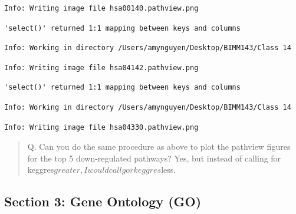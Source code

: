 \documentclass[
  letterpaper,
  DIV=11,
  numbers=noendperiod]{scrartcl}
\newenvironment{Shaded}{\begin{snugshade}}{\end{snugshade}}
\newcommand{\AttributeTok}[1]{\textcolor[rgb]{0.40,0.45,0.13}{#1}}
\newcommand{\CommentTok}[1]{\textcolor[rgb]{0.37,0.37,0.37}{#1}}
\newcommand{\FunctionTok}[1]{\textcolor[rgb]{0.28,0.35,0.67}{#1}}
\newcommand{\NormalTok}[1]{\textcolor[rgb]{0.00,0.23,0.31}{#1}}
\newcommand{\OtherTok}[1]{\textcolor[rgb]{0.00,0.23,0.31}{#1}}
\newcommand{\SpecialCharTok}[1]{\textcolor[rgb]{0.37,0.37,0.37}{#1}}
\begin{document}
\begin{verbatim}
Info: Writing image file hsa00140.pathview.png
\end{verbatim}

\begin{verbatim}
'select()' returned 1:1 mapping between keys and columns
\end{verbatim}

\begin{verbatim}
Info: Working in directory /Users/amynguyen/Desktop/BIMM143/Class 14
\end{verbatim}

\begin{verbatim}
Info: Writing image file hsa04142.pathview.png
\end{verbatim}

\begin{verbatim}
'select()' returned 1:1 mapping between keys and columns
\end{verbatim}

\begin{verbatim}
Info: Working in directory /Users/amynguyen/Desktop/BIMM143/Class 14
\end{verbatim}

\begin{verbatim}
Info: Writing image file hsa04330.pathview.png
\end{verbatim}

\begin{quote}
Q. Can you do the same procedure as above to plot the pathview figures
for the top 5 down-regulated pathways? Yes, but instead of calling for
keggres\(greater, I would call gor keggres\)less.
\end{quote}

\subsection{Section 3: Gene Ontology
(GO)}\label{section-3-gene-ontology-go}

\begin{Shaded}
\end{Shaded}
\end{document}
